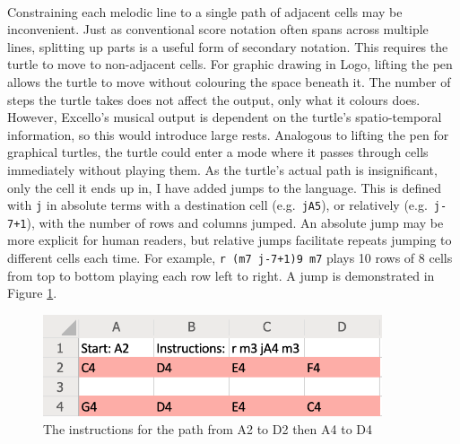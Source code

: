 \paragraph{} Constraining each melodic line to a single path of adjacent cells may be inconvenient. Just as conventional score notation often spans across multiple lines, splitting up parts is a useful form of secondary notation. This requires the turtle to move to non-adjacent cells. For graphic drawing in Logo, lifting the pen allows the turtle to move without colouring the space beneath it. The number of steps the turtle takes does not affect the output, only what it colours does. However, Excello's musical output is dependent on the turtle's spatio-temporal information, so this would introduce large rests. Analogous to lifting the pen for graphical turtles, the turtle could enter a mode where it passes through cells immediately without playing them. As the turtle's actual path is insignificant, only the cell it ends up in, I have added jumps to the language. This is defined with \texttt{j} in absolute terms with a destination cell (e.g.~\texttt{jA5}), or relatively (e.g.~\texttt{j-7+1}), with the number of rows and columns jumped. An absolute jump may be more explicit for human readers, but relative jumps facilitate repeats jumping to different cells each time. For example, \texttt{r (m7 j-7+1)9 m7} plays 10 rows of 8 cells from top to bottom playing each row left to right. A jump is demonstrated in Figure \ref{prep:language2}.

\begin{figure}[ht]
  \centerline{\includegraphics[width=100mm]{figs/diss2.png}}
\caption{The instructions for the path from A2 to D2 then A4 to D4}
\label{prep:language2}
\end{figure}
\vspace{-20pt}

